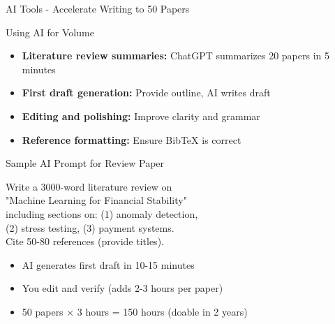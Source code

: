 \documentclass[11pt]{beamer}
\begin{document}
\begin{frame}{AI Tools - Accelerate Writing to 50 Papers}
	\scriptsize
	\begin{block}{Using AI for Volume}
		\begin{itemize}
			\item \textbf{Literature review summaries:} ChatGPT summarizes 20 papers in 5 minutes
			\item \textbf{First draft generation:} Provide outline, AI writes draft
			\item \textbf{Editing and polishing:} Improve clarity and grammar
			\item \textbf{Reference formatting:} Ensure BibTeX is correct
		\end{itemize}
	\end{block}
	\begin{block}{Sample AI Prompt for Review Paper}
		\begin{center}
			\ttfamily
			Write a 3000-word literature review on \\
			"Machine Learning for Financial Stability" \\
			including sections on: (1) anomaly detection, \\
			(2) stress testing, (3) payment systems. \\
			Cite 50-80 references (provide titles).
		\end{center}
		\begin{itemize}
			\item AI generates first draft in 10-15 minutes
			\item You edit and verify (adds 2-3 hours per paper)
			\item 50 papers × 3 hours = 150 hours (doable in 2 years)
		\end{itemize}
	\end{block}
\end{frame}
\end{document}
